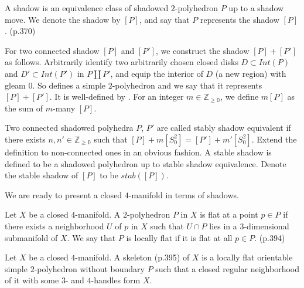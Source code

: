 \begin{definition}[shadow]\label{def/shadow}
  A shadow is an equivalence class of shadowed $2$-polyhedron $P$
  up to a shadow move. We denote the shadow by $[P]$, and say
  that $P$ represents the shadow $[P]$. (p.370)
\end{definition}

\noindent For two connected shadow $[P]$ and $[P']$, we construct
the shadow $[P]+[P']$ as follows. Arbitrarily identify two
arbitrarily chosen closed disks $D \subset Int(P)$ and
$D' \subset Int(P')$ in $P \coprod P'$, and equip the interior of
$D$ (a new region) with gleam $0$. So defines a simple
$2$-polyhedron and we say that it represents $[P]+[P']$. It is
well-defined by \cite[lemma VIII.2.1.1]{turaev-}. For an integer
$m \in \mathbb{Z_{\geq 0}}$, we define $m[P]$ as the sum of
$m$-many $[P]$.

\begin{definition}\label{def/stable-shadow}
  Two connected shadowed polyhedra $P$, $P'$ are called stably
  shadow equivalent if there exists
  $n, n' \in \mathbb{Z_{\geq 0}}$ such that
  $[P] + m[S^{2}_{0}] = [P'] + m'[S^{2}_{0}]$. Extend the
  definition to non-connected ones in an obvious fashion. A
  stable shadow is defined to be a shadowed polyhedron up to
  stable shadow equivalence. Denote the stable shadow of $[P]$ to
  be $stab([P])$.
\end{definition}

We are ready to present a closed $4$-manifold in terms of
shadows.

\begin{definition}\label{def/locally-flat-2-polyhedron-in-a-4-manifold}
  Let $X$ be a closed $4$-manifold. A $2$-polyhedron $P$ in $X$
  is flat at a point $p \in P$ if there exists a neighborhood $U$
  of $p$ in $X$ such that $U \cap P$ lies in a $3$-dimensional
  submanifold of $X$. We say that $P$ is locally flat if it is
  flat at all $p \in P$. (p.394)
\end{definition}

\begin{definition}\label{def/skeleton-of-a-4-manifold}
  Let $X$ be a closed $4$-manifold. A skeleton (p.395) of $X$ is
  a locally flat orientable simple $2$-polyhedron without
  boundary $P$ such that a closed regular neighborhood of it with
  some $3$- and $4$-handles form $X$.
\end{definition}

